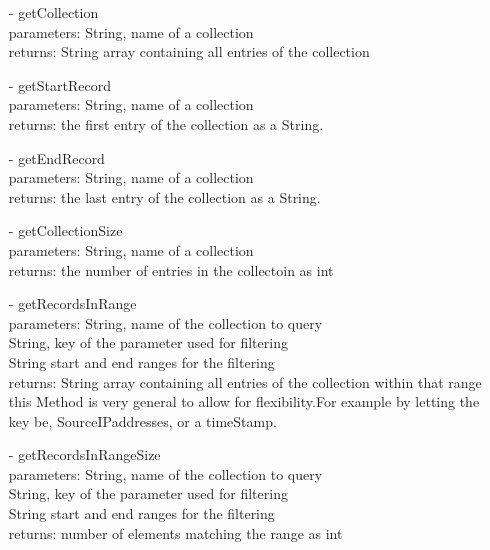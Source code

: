 \documentclass[oneside, english, final]{design}
\begin{document}
\begin{itemize}
\begin{itemize}
		      \item[-]getCollection
		            \\parameters: String, name of a collection
		            \\returns: String array containing all entries of the collection

		      \item[-]getStartRecord
		            \\parameters: String, name of a collection
		            \\returns: the first entry of the collection as a String.

		      \item[-]getEndRecord
		            \\parameters: String, name of a collection
		            \\returns: the last entry of the collection as a String.

		      \item[-]getCollectionSize
		            \\parameters: String, name of a collection
		            \\returns: the number of entries in the collectoin as int

		      \item[-]getRecordsInRange
		            \\parameters: String, name of the collection to query
		            \\String, key of the parameter used for filtering
		            \\String start and end ranges for the filtering
		            \\returns: String array containing all entries of the collection within that range
		            \\this Method is very general to allow for flexibility.For example by letting the key be, SourceIPaddresses, or a timeStamp.

		      \item[-]getRecordsInRangeSize
		            \\parameters: String, name of the collection to query
		            \\String, key of the parameter used for filtering
		            \\String start and end ranges for the filtering
		            \\returns: number of elements matching the range as int


	      \end{itemize}


\end{itemize}
\end{document}

